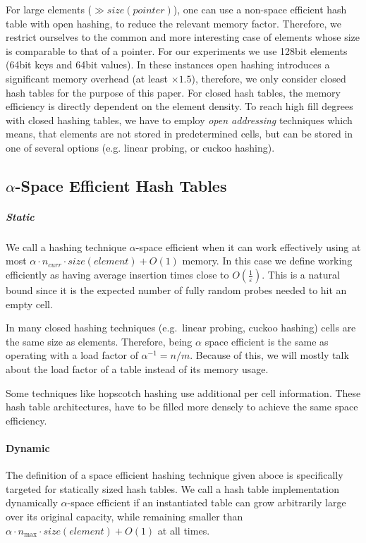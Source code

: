\documentclass[a4paper,UKenglish]{lipics-v2016}
\begin{document}
For large elements ($\gg size(pointer)$), one can use a non-space
efficient hash table with open hashing, to reduce the relevant memory
factor.  Therefore, we restrict ourselves to the common and more interesting case of
elements whose size is comparable to that of a pointer.  For our
experiments we use 128bit elements (64bit keys and 64bit values).  In
these instances open hashing introduces a significant memory
overhead (at least $\times1.5$), therefore, we only consider closed
hash tables for the purpose of this paper. For closed hash tables, the
memory efficiency is directly dependent on the element density.  To
reach high fill degrees with closed hashing tables, we have to employ
\emph{open addressing} techniques which means, that elements are not
stored in predetermined cells, but can be stored in one of several
options (e.g. linear probing, or cuckoo hashing).

\subsection{$\alpha$-Space Efficient Hash Tables}
\subparagraph*{Static}
\label{sec:pre_staticspace}
We call a hashing technique $\alpha$-space efficient when it can work
effectively using at most $\alpha \cdot n_{\textit{curr}} \cdot \textit{size}(\textit{element}) + O(1)$ memory. In
this case we define working efficiently as having average insertion
times close to $O(\frac{1}{\varepsilon})$. This is a natural bound
since it is the expected number of fully random probes needed to hit
an empty cell.


In many closed hashing techniques (e.g.~linear probing, cuckoo
hashing) cells are the same size as elements. Therefore, being
$\alpha$ space efficient is the same as operating with a load factor
of $\alpha^{-1} = n/m$.
Because of this, we will mostly talk about the load factor of a table
instead of its memory usage.

Some techniques like hopscotch hashing use additional per cell
information.  These hash table architectures, have to be filled more
densely to achieve the same space efficiency.

\paragraph*{Dynamic}
The definition of a space efficient hashing technique given aboce is
specifically targeted for statically sized hash tables.  We call a
hash table implementation dynamically $\alpha$-space efficient if an
instantiated table can grow arbitrarily large over its original
capacity, while remaining smaller than $\alpha\cdot n_{\max}\cdot
\textit{size}(\textit{element}) + O(1)$ at all times.
\end{document}
